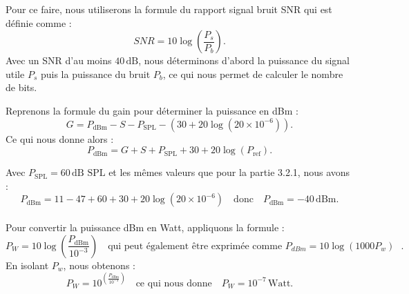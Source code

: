 Pour ce faire, nous utiliserons la formule du rapport signal bruit SNR qui est définie comme :
\begin{equation}
SNR = 10 \log \left( \frac{P_s}{P_b} \right).
\end{equation}
Avec un SNR d'au moins \( 40 \, \text{dB} \), nous déterminons d'abord la puissance du signal utile \( P_s \) puis la puissance du bruit \( P_b \), ce qui nous permet de calculer le nombre de bits.

Reprenons la formule du gain pour déterminer la puissance en dBm :
\begin{equation}
G = P_{\text{dBm}} - S - P_{\text{SPL}} - \left( 30 + 20 \log \left( 20 \times 10^{-6} \right) \right).
\end{equation}
Ce qui nous donne alors :
\begin{equation}
P_{\text{dBm}} = G + S + P_{\text{SPL}} + 30 + 20 \log(P_{\text{ref}}).
\end{equation}

Avec \( P_{\text{SPL}} = 60 \, \text{dB SPL} \) et les mêmes valeurs que pour la partie 3.2.1, nous avons :
\begin{equation}
P_{\text{dBm}} = 11 - 47 + 60 + 30 + 20 \log(20 \times 10^{-6}) \quad \text{donc} \quad P_{\text{dBm}} = -40 \, \text{dBm}.
\end{equation}
\\

Pour convertir la puissance dBm en Watt, appliquons la formule :
\begin{equation}
P_W = 10\log{\left( \frac{P_{\text{dBm}}}{10^{-3}}  \right)} \quad \text{qui peut également être exprimée comme $P_{dBm} = 10\log(1000P_w)$ }.
\end{equation}
En isolant $P_w$, nous obtenons :
\begin{equation}
P_W = 10^{\left( \frac{P_{\text{dBm}}}{10^{-3}}  \right)} \quad \text{ce qui nous donne} \quad P_W = 10^{-7} \, \text{Watt}.
\end{equation}

